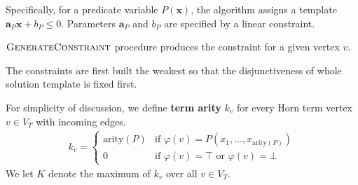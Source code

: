 \documentclass[a4paper,12pt]{article}
\begin{document}
\begin{algorithm}
\caption{$ \solveHorn (G) $}\label{alg:solveHorn}
\begin{algorithmic}
\REPEAT
  \ELSE
  \ENDIF
{}
\end{algorithmic}
\end{algorithm}


Specifically, for a predicate variable $P(\mathbf{x})$,
the algorithm assigns a template $\mathbf{a}_P \mathbf{x} + b_P \leq
0$.  Parameters $\mathbf{a}_P$ and $b_P$ are specified by a linear
constraint.

\begin{algorithm}
\caption{$ \genConstr (v, visited) $}\label{alg:genConstr}
\begin{algorithmic}
    \ELSE
    \ENDIF
  \ENDFOR
\ENDFOR
\end{algorithmic}
\end{algorithm}

$\mbox{\sc GenerateConstraint}$ procedure produces the constraint for a given vertex $v$.

The constraints are first built the weakest so that the disjunctiveness of
whole solution template is fixed first.




For simplicity of discussion, we define \textbf{term arity} $k_v$ for
every Horn term vertex $v \in V_T$ with incoming edges.
\begin{align*}
k_v =
\begin{cases}
\mathrm{arity}(P) & \mbox{if } \varphi(v) = P(x_1,...,x_{\mathrm{arity}(P)}) \\
0 & \mbox{if } \varphi(v) = \top \mbox { or } \varphi(v) = \bot
\end{cases}
\end{align*}
We let $K$ denote the maximum of $k_v$ over all $v \in V_T$.
\end{document}
